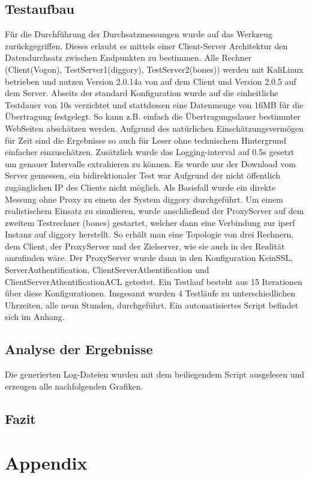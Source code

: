 \documentclass[12pt, a4paper]{scrartcl}
\begin{document}
\subsection{Testaufbau}
Für die Durchführung der Durchsatzmessungen wurde auf das Werkzeug  zurückgegriffen. Dieses erlaubt es mittels einer Client-Server Architektur den Datendurchsatz zwischen Endpunkten zu bestimmen.\newline
Alle Rechner (Client(Vogon), TestServer1(diggory), TestServer2(bones)) werden mit KaliLinux betrieben und nutzen Version 2.0.14a von  auf dem Client und Version 2.0.5 auf dem Server. Abseits der standard Konfiguration wurde auf die einheitliche Testdauer von 10s verzichtet und stattdessen eine Datenmenge von 16MB für die Übertragung festgelegt. So kann z.B. einfach die Übertragungsdauer bestimmter WebSeiten abschätzen werden. Aufgrund des natürlichen Einschätzungsvermögen für Zeit sind die Ergebnisse so auch für Leser ohne technischem Hintergrund einfacher einzuschätzen. Zusätzlich wurde das Logging-interval auf 0.5s gesetzt um genauer Intervalle extrahieren zu können. Es wurde nur der Download vom Server gemessen, ein bidirektionaler Test war Aufgrund der nicht öffentlich zugänglichen IP des Clients nicht möglich.\newline
Als Basisfall wurde ein direkte Messung ohne Proxy zu einem der System diggory durchgeführt. Um einem realistischem Einsatz zu simulieren, wurde anschließend der ProxyServer auf dem zweitem Testrechner (bones) gestartet, welcher dann eine Verbindung zur iperf Instanz auf diggory herstellt. So erhält man eine Topologie von drei Rechnern, dem Client, der ProxyServer und der Zielserver, wie sie auch in der Realität anzufinden wäre.\newline
Der ProxyServer wurde dann in den Konfiguration KeinSSL, ServerAuthentification, ClientServerAthentification und ClientServerAthentificationACL getestet. Ein Testlauf besteht aus 15 Iterationen über diese Konfigurationen. Insgesamt wurden 4 Testläufe zu unterschiedlichen Uhrzeiten, alle neun Stunden, durchgeführt. Ein automatisiertes Script befindet sich im Anhang.
\subsection{Analyse der Ergebnisse}
Die generierten Log-Dateien wurden mit dem beiliegendem Script ausgelesen und erzeugen alle nachfolgenden Grafiken.
\subsection{Fazit}

\newpage
\renewcommand{\thesubsection}{\Alph{subsection}}
\setcounter{page}{\value{lastroman}}
\section*{Appendix}


\end{document}
